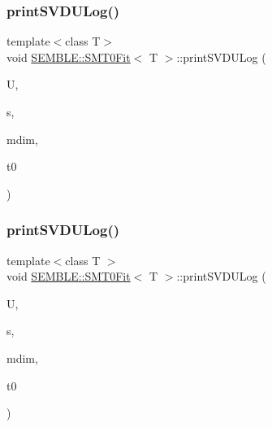 \mbox{\label{structSEMBLE_1_1SMT0Fit_a054737215697a880fe9feedacb6ffb61}} 
\subsubsection{\texorpdfstring{printSVDULog()}{printSVDULog()}\hspace{0.1cm}{\footnotesize\ttfamily [1/2]}}
{\footnotesize\ttfamily template$<$class T$>$ \\
void \mbox{\hyperlink{structSEMBLE_1_1SMT0Fit}{S\+E\+M\+B\+L\+E\+::\+S\+M\+T0\+Fit}}$<$ T $>$\+::print\+S\+V\+D\+U\+Log (\begin{DoxyParamCaption}\item[{const \mbox{\hyperlink{structSEMBLE_1_1SembleMatrix}{Semble\+Matrix}}$<$ T $>$ \&}]{U,  }\item[{const \mbox{\hyperlink{structSEMBLE_1_1SembleVector}{Semble\+Vector}}$<$ double $>$ \&}]{s,  }\item[{const int}]{mdim,  }\item[{const int}]{t0 }\end{DoxyParamCaption})}

\mbox{\label{structSEMBLE_1_1SMT0Fit_a054737215697a880fe9feedacb6ffb61}} 
\subsubsection{\texorpdfstring{printSVDULog()}{printSVDULog()}\hspace{0.1cm}{\footnotesize\ttfamily [2/2]}}
{\footnotesize\ttfamily template$<$class T $>$ \\
void \mbox{\hyperlink{structSEMBLE_1_1SMT0Fit}{S\+E\+M\+B\+L\+E\+::\+S\+M\+T0\+Fit}}$<$ T $>$\+::print\+S\+V\+D\+U\+Log (\begin{DoxyParamCaption}\item[{const \mbox{\hyperlink{structSEMBLE_1_1SembleMatrix}{Semble\+Matrix}}$<$ T $>$ \&}]{U,  }\item[{const \mbox{\hyperlink{structSEMBLE_1_1SembleVector}{Semble\+Vector}}$<$ double $>$ \&}]{s,  }\item[{const int}]{mdim,  }\item[{const int}]{t0 }\end{DoxyParamCaption})}

